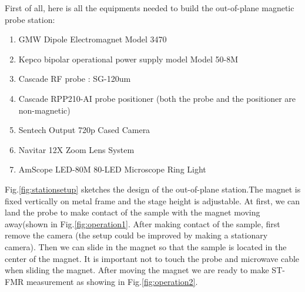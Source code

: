 First of all, here is all the equipments needed to build the out-of-plane magnetic probe station:

\begin{enumerate}
  \item GMW Dipole Electromagnet Model 3470
  \item Kepco bipolar operational power supply model Model 50-8M 
  \item Cascade RF probe : SG-120um
  \item Cascade RPP210-AI probe positioner (both the probe and the positioner are non-magnetic)
  \item Sentech Output 720p Cased Camera
  \item Navitar 12X Zoom Lens System
  \item AmScope LED-80M 80-LED Microscope Ring Light
\end{enumerate}

Fig.\ref{fig:stationsetup} sketches the design of the out-of-plane station.The magnet is fixed vertically on metal frame and the stage height is adjustable. At first, we can land the probe to make contact of the sample with the magnet moving away(shown in Fig.\ref{fig:operation1}. After making contact of the sample, first remove the camera (the setup could be improved by making a stationary camera). Then we can slide in the magnet so that the sample is located in the center of the magnet. It is important not to touch the probe and microwave cable when sliding the magnet. After moving the magnet we are ready to make ST-FMR measurement as showing in Fig.\ref{fig:operation2}.


